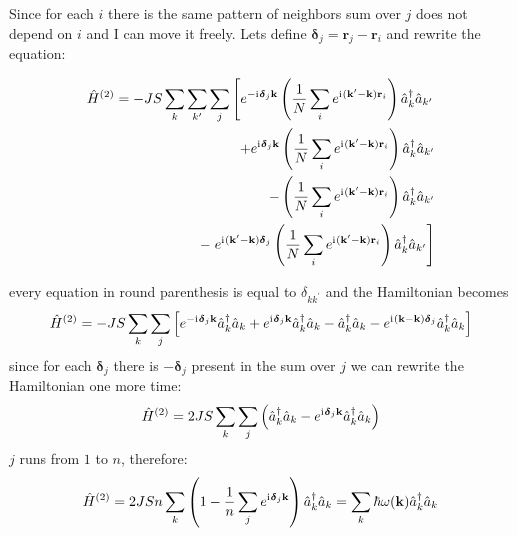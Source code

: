 Since for each $i$ there is the same pattern of neighbors sum over $j$ does not depend on $i$ and I can move it freely.
Lets define $\mathbf{\delta}_j = \mathbf{r}_j - \mathbf{r}_i$ and rewrite the equation:

\begin{equation}
\begin{aligned}
    \hat{H}^{(2)}  = -JS \sum_k\sum_{k^{\prime}}\sum_j \left[
        e^{-\mathrm{i}\mkern1mu\boldsymbol{\delta}_j\mathbf{k}}
        \left(\dfrac{1}{N}\sum_ie^{\mathrm{i}\mkern1mu(\mathbf{k^{\prime}}-\mathbf{k})\mathbf{r}_i}\right) 
        \hat{a}_k^{\dag}\hat{a}_{k^{\prime}}\right. \\
        +
        e^{\mathrm{i}\mkern1mu\boldsymbol{\delta}_j\mathbf{k}}
        \left(\dfrac{1}{N}\sum_ie^{\mathrm{i}\mkern1mu(\mathbf{k^{\prime}}-\mathbf{k})\mathbf{r}_i}\right)
         \hat{a}_k^{\dag}\hat{a}_{k^{\prime}}  \\
        -
        \left(\dfrac{1}{N}\sum_ie^{\mathrm{i}\mkern1mu(\mathbf{k^{\prime}}-\mathbf{k})\mathbf{r}_i}\right)
        \hat{a}_k^{\dag}\hat{a}_{k^{\prime}}  \\
        -
        \left.e^{\mathrm{i}\mkern1mu(\mathbf{k^{\prime}}-\mathbf{k})\boldsymbol{\delta}_j}
        \left(\dfrac{1}{N}\sum_ie^{\mathrm{i}\mkern1mu(\mathbf{k^{\prime}}-\mathbf{k})\mathbf{r}_i}\right)
        \hat{a}_k^{\dag}\hat{a}_{k^{\prime}} \right]
\end{aligned}
\end{equation}

\noindent every equation in round parenthesis is equal to $\delta_{kk^{\prime}}$ and the Hamiltonian becomes
\begin{equation}
    \hat{H}^{(2)} = -JS\sum_k\sum_j\left[e^{-\mathrm{i}\mkern1mu\boldsymbol{\delta}_j\mathbf{k}}
    \hat{a}_k^{\dag}\hat{a}_k
    +
    e^{\mathrm{i}\mkern1mu\boldsymbol{\delta}_j\mathbf{k}}
     \hat{a}_k^{\dag}\hat{a}_k 
    -
    \hat{a}_k^{\dag}\hat{a}_k 
    -
    e^{\mathrm{i}\mkern1mu(\mathbf{k}-\mathbf{k})\boldsymbol{\delta}_j}
    \hat{a}_k^{\dag}\hat{a}_k\right]
\end{equation}
since for each $\boldsymbol{\delta}_j$ there is $-\boldsymbol{\delta}_j$ 
present in the sum over $j$ we can rewrite the Hamiltonian one more time:
\begin{equation}
    \hat{H}^{(2)} = 2JS\sum_k\sum_j\left(\hat{a}_k^{\dag}\hat{a}_k - 
    e^{\mathrm{i}\mkern1mu\boldsymbol{\delta}_j\mathbf{k}}\hat{a}_k^{\dag}\hat{a}_k\right)
\end{equation}
$j$ runs from $1$ to $n$, therefore:
\begin{equation}
    \hat{H}^{(2)} = 2JSn\sum_k\left(1 - \dfrac{1}{n}\sum_j
    e^{\mathrm{i}\mkern1mu\boldsymbol{\delta}_j\mathbf{k}}\right)\hat{a}_k^{\dag}\hat{a}_k = 
    \sum_k \hbar\omega(\mathbf{k})\hat{a}_k^{\dag}\hat{a}_k
\end{equation}

